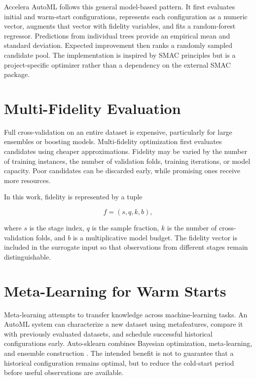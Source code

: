 \documentclass[12pt,a4paper,oneside]{report}
\newcommand{\systemname}{Accelera AutoML}
\begin{document}
\medskip
\noindent \systemname{} follows this general model-based pattern. It first evaluates
initial and warm-start configurations, represents each configuration as a
numeric vector, augments that vector with fidelity variables, and fits a
random-forest regressor. Predictions from individual trees provide an empirical
mean and standard deviation. Expected improvement then ranks a randomly sampled
candidate pool. The implementation is inspired by SMAC principles but is a
project-specific optimizer rather than a dependency on the external SMAC
package.

\section{Multi-Fidelity Evaluation}

Full cross-validation on an entire dataset is expensive, particularly for
large ensembles or boosting models. Multi-fidelity optimization first evaluates
candidates using cheaper approximations. Fidelity may be varied by the number
of training instances, the number of validation folds, training iterations, or
model capacity. Poor candidates can be discarded early, while promising ones
receive more resources.

\noindent In this work, fidelity is represented by a tuple

\begin{equation}
  f = (s, q, k, b),
\end{equation}

\noindent where $s$ is the stage index, $q$ is the sample fraction, $k$ is the number of
cross-validation folds, and $b$ is a multiplicative model budget. The fidelity
vector is included in the surrogate input so that observations from different
stages remain distinguishable.

\section{Meta-Learning for Warm Starts}

Meta-learning attempts to transfer knowledge across machine-learning tasks.
An AutoML system can characterize a new dataset using metafeatures, compare it
with previously evaluated datasets, and schedule successful historical
configurations early. Auto-sklearn combines Bayesian optimization,
meta-learning, and ensemble construction \cite{autosklearn}. The intended
benefit is not to guarantee that a historical configuration remains optimal,
but to reduce the cold-start period before useful observations are available.
\end{document}

